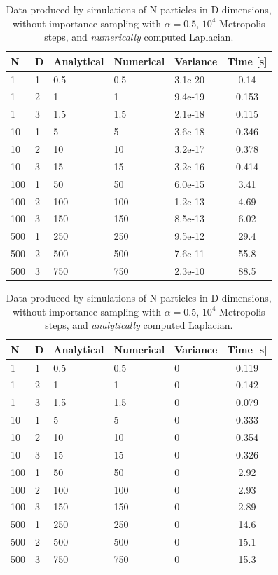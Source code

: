 \documentclass[english, a4paper]{article}
\begin{document}
\begin{table}[H]
  \caption{Data produced by simulations of N particles in D dimensions, without importance sampling with $\alpha=0.5$, $10^4$ Metropolis steps, and \emph{numerically} computed Laplacian.}
\begin{tabularx}{\textwidth}{X X X X X c}
	\toprule
	N &D &Analytical &Numerical &Variance &Time [s] \\*
	\midrule
	1& 1& 0.5& 0.5& 3.1e-20& 0.14\\*
	1& 2& 1& 1& 9.4e-19& 0.153\\*
	1& 3& 1.5& 1.5& 2.1e-18& 0.115\\*
	10& 1& 5& 5& 3.6e-18& 0.346\\*
	10& 2& 10& 10& 3.2e-17& 0.378\\*
	10& 3& 15& 15& 3.2e-16& 0.414\\*
	100& 1& 50& 50& 6.0e-15& 3.41\\*
	100& 2& 100& 100& 1.2e-13& 4.69\\*
	100& 3& 150& 150& 8.5e-13& 6.02\\*
	500& 1& 250& 250& 9.5e-12& 29.4\\*
	500& 2& 500& 500& 7.6e-11& 55.8\\*
	500& 3& 750& 750& 2.3e-10& 88.5\\*
	\bottomrule
\end{tabularx}
 \label{tab:Tabell1}
\end{table}




\begin{table}[H]
	\caption{Data produced by simulations of N particles in D dimensions, without importance sampling with $\alpha=0.5$, $10^4$ Metropolis steps, and \emph{analytically} computed Laplacian. }
	\begin{tabularx}{\textwidth}{X X X X X c}
		\toprule
    N &D &Analytical &Numerical &Variance &Time [s] \\*
    \hline
    1& 1& 0.5& 0.5& 0& 0.119\\*
    1& 2& 1& 1& 0& 0.142\\*
    1& 3& 1.5& 1.5& 0& 0.079\\*
    10& 1& 5& 5& 0& 0.333\\*
    10& 2& 10& 10& 0& 0.354\\*
    10& 3& 15& 15& 0& 0.326\\*
    100& 1& 50& 50& 0& 2.92\\*
    100& 2& 100& 100& 0& 2.93\\*
    100& 3& 150& 150& 0& 2.89\\*
    500& 1& 250& 250& 0& 14.6\\*
    500& 2& 500& 500& 0& 15.1\\*
    500& 3& 750& 750& 0& 15.3\\*
    \bottomrule
\end{tabularx}
\label{tab:Tabell2}
\end{table}
\end{document}
